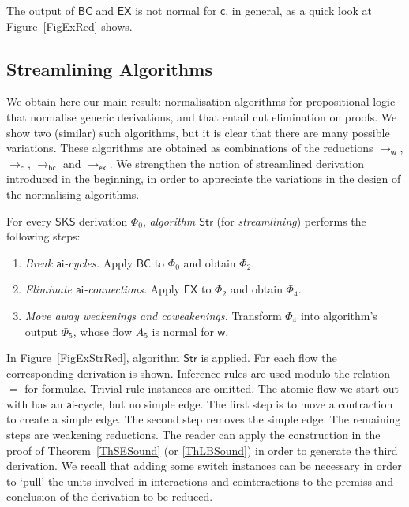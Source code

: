 \documentclass[a4paper]{LMCS}
\begin{document}
The output of ${{\mathsf{BC}}}$ and ${{\mathsf{EX}}}$ is not normal for ${{\mathsf c}}$, in general, as a quick look at Figure~\ref{FigExRed} shows. 

\subsection{Streamlining Algorithms}\label{SubsStrPr}

We obtain here our main result: normalisation algorithms for propositional logic that normalise generic derivations, and that entail cut elimination on proofs. We show two (similar) such algorithms, but it is clear that there are many possible variations. These algorithms are obtained as combinations of the reductions $\to_{{\mathsf w}}$, $\to_{{\mathsf c}}$, $\to_{{\mathsf{bc}}}$ and $\to_{{\mathsf{ex}}}$. We strengthen the notion of streamlined derivation introduced in the beginning, in order to appreciate the variations in the design of the normalising algorithms.

\begin{defi}\label{DefStr}
For every ${\mathsf{SKS}}$ derivation $\Phi_0$, \emph{algorithm\/ ${\mathsf{Str}}$} (for \emph{streamlining}) performs the following steps:
\begin{enumerate}
\item\emph{Break\/ ${\mathsf{ai}}$-cycles.} Apply ${{\mathsf{BC}}}$ to $\Phi_0$ and obtain $\Phi_2$.
\item\emph{Eliminate\/ ${\mathsf{ai}}$-connections.} Apply ${{\mathsf{EX}}}$ to $\Phi_2$ and obtain $\Phi_4$.
\item\emph{Move away weakenings and coweakenings.} Transform $\Phi_4$ into algorithm's output $\Phi_5$, whose flow $A_5$ is normal for ${{\mathsf w}}$.
\end{enumerate}
\end{defi}

\begin{exa}
In Figure~\ref{FigExStrRed}, algorithm ${\mathsf{Str}}$ is applied. For each flow the corresponding derivation is shown. Inference rules are used modulo the relation $=$ for formulae. Trivial rule instances are omitted. The atomic flow we start out with has an ${\mathsf{ai}}$-cycle, but no simple edge. The first step is to move a contraction to create a simple edge. The second step removes the simple edge. The remaining steps are weakening reductions. The reader can apply the construction in the proof of Theorem~\ref{ThSESound} (or \ref{ThLBSound}) in order to generate the third derivation. We recall that adding some switch instances can be necessary in order to `pull' the units involved in interactions and cointeractions to the premiss and conclusion of the derivation to be reduced.
\end{exa}
\end{document}
